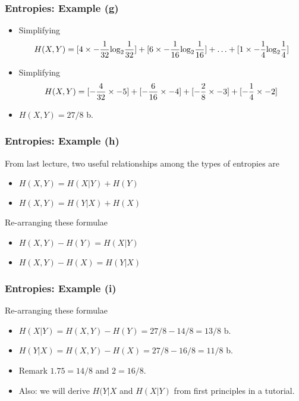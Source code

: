 ﻿\documentclass[a4]{beamer}
\begin{document}
\begin{frame}
\frametitle{Entropies: Example (g)}
\begin{itemize}
\item Simplifying\[ H(X,Y) = [4 \times -{1\over 32} \mbox{log}_2 {1\over 32} ] + [6 \times -{1\over 16} \mbox{log}_2 {1\over 16} ] + \ldots + [1 \times -{1\over 4} \mbox{log}_2 {1\over 4} ] \]
\item Simplifying \[H(X,Y) = [-{4\over 32} \times -5 ] + [-{6\over 16} \times -4 ] + [-{2\over 8} \times -3 ] + [ -{1\over 4} \times -2]\]
\item $H(X,Y) = 27/8$ b.
\end{itemize}
\end{frame}

\begin{frame}
\frametitle{Entropies: Example (h)}
From last lecture, two useful relationships among the types of entropies are
\begin{itemize}
\item $H(X,Y)=H(X|Y)+H(Y) $
\item $H(X,Y)=H(Y|X)+H(X) $
\end{itemize}
\bigskip
Re-arranging these formulae
\begin{itemize}
\item $H(X,Y)-H(Y) = H(X|Y) $
\item $H(X,Y)-H(X) = H(Y|X) $
\end{itemize}
\end{frame}


\begin{frame}
\frametitle{Entropies: Example (i)}
Re-arranging these formulae
\begin{itemize}
\item $H(X|Y) = H(X,Y)-H(Y) = 27/8 - 14/8 = 13/8$ b. \bigskip
\item $H(Y|X) = H(X,Y)-H(X) = 27/8 - 16/8 = 11/8$ b.
\end{itemize}
\bigskip
\begin{itemize}
\item Remark $1.75 =14/8$ and $2 = 16/8$.\\\bigskip
\item Also: we will derive $H(Y|X$ and $H(X|Y)$ from first principles in a tutorial.
\end{itemize}
\end{frame}
\end{document}
